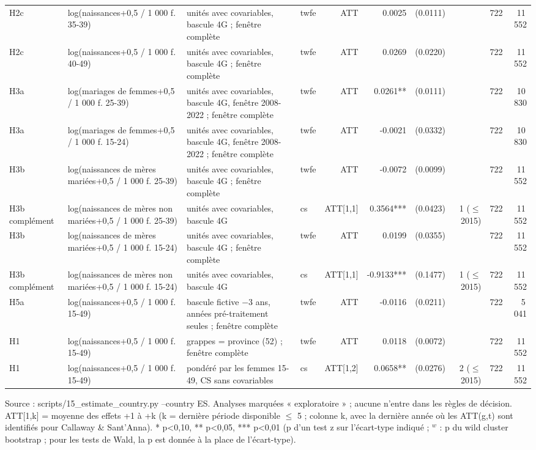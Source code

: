 \begin{table}
\begin{threeparttable}
\begin{tabular}{lp{5.4cm}p{6.1cm}lrrrrrr}
H2c & log(naissances+0,5 / 1 000 f. 35-39) & unités avec covariables, bascule 4G ; fenêtre complète & twfe & ATT & 0.0025 & (0.0111) &  & 722 & 11\,552 \\
H2c & log(naissances+0,5 / 1 000 f. 40-49) & unités avec covariables, bascule 4G ; fenêtre complète & twfe & ATT & 0.0269 & (0.0220) &  & 722 & 11\,552 \\
H3a & log(mariages de femmes+0,5 / 1 000 f. 25-39) & unités avec covariables, bascule 4G, fenêtre 2008-2022 ; fenêtre complète & twfe & ATT & 0.0261** & (0.0111) &  & 722 & 10\,830 \\
H3a & log(mariages de femmes+0,5 / 1 000 f. 15-24) & unités avec covariables, bascule 4G, fenêtre 2008-2022 ; fenêtre complète & twfe & ATT & -0.0021 & (0.0332) &  & 722 & 10\,830 \\
H3b & log(naissances de mères mariées+0,5 / 1 000 f. 25-39) & unités avec covariables, bascule 4G ; fenêtre complète & twfe & ATT & -0.0072 & (0.0099) &  & 722 & 11\,552 \\
H3b complément & log(naissances de mères non mariées+0,5 / 1 000 f. 25-39) & unités avec covariables, bascule 4G & cs & ATT[1,1] & 0.3564*** & (0.0423) & 1 ($\leq$ 2015) & 722 & 11\,552 \\
H3b & log(naissances de mères mariées+0,5 / 1 000 f. 15-24) & unités avec covariables, bascule 4G ; fenêtre complète & twfe & ATT & 0.0199 & (0.0355) &  & 722 & 11\,552 \\
H3b complément & log(naissances de mères non mariées+0,5 / 1 000 f. 15-24) & unités avec covariables, bascule 4G & cs & ATT[1,1] & -0.9133*** & (0.1477) & 1 ($\leq$ 2015) & 722 & 11\,552 \\
H5a & log(naissances+0,5 / 1 000 f. 15-49) & bascule fictive $-$3 ans, années pré-traitement seules ; fenêtre complète & twfe & ATT & -0.0116 & (0.0211) &  & 722 & 5\,041 \\
H1 & log(naissances+0,5 / 1 000 f. 15-49) & grappes = province (52) ; fenêtre complète & twfe & ATT & 0.0118 & (0.0072) &  & 722 & 11\,552 \\
H1 & log(naissances+0,5 / 1 000 f. 15-49) & pondéré par les femmes 15-49, CS sans covariables & cs & ATT[1,2] & 0.0658** & (0.0276) & 2 ($\leq$ 2015) & 722 & 11\,552 \\
\bottomrule
\end{tabular}
\begin{tablenotes}\footnotesize
\item Source : scripts/15\_estimate\_country.py --country ES. Analyses marquées « exploratoire » ; aucune n'entre dans les règles de décision. ATT[1,k] = moyenne des effets +1 à +k (k = dernière période disponible $\leq$ 5 ; colonne k, avec la dernière année où les ATT(g,t) sont identifiés pour Callaway \& Sant'Anna). * p<0,10, ** p<0,05, *** p<0,01 (p d'un test z sur l'écart-type indiqué ; $^{w}$ : p du wild cluster bootstrap ; pour les tests de Wald, la p est donnée à la place de l'écart-type).
\end{tablenotes}
\end{threeparttable}
\end{table}
